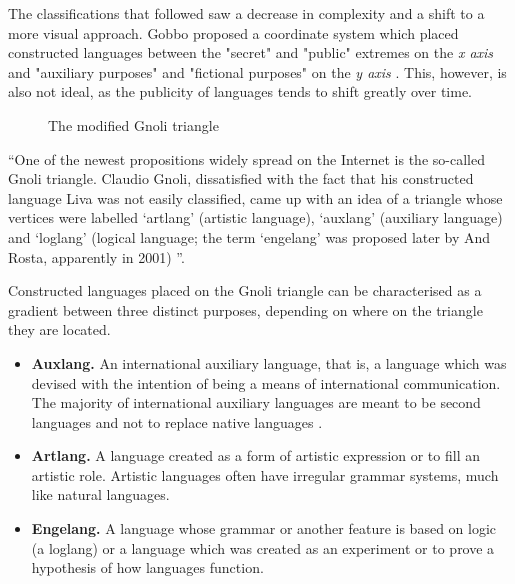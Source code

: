 \documentclass[14pt, a4paper]{extreport}
\begin{document}
The classifications that followed saw a decrease in complexity and a shift to a more visual approach. Gobbo proposed a coordinate system which placed constructed languages between the "secret" and "public" extremes on the \textit{x axis} and "auxiliary purposes" and "fictional purposes" on the \textit{y axis} \parencite{gobbo}. This, however, is also not ideal, as the publicity of languages tends to shift greatly over time.

\begin{figure}[ht]%
  \bigskip
  \centering
  \caption{The modified Gnoli triangle}
\end{figure}%

``One of the newest propositions widely spread on the Internet is the so-called Gnoli triangle. Claudio Gnoli, dissatisfied with the fact that his constructed language Liva was not easily classified, came up with an idea of a triangle whose vertices were labelled ‘artlang’ (artistic language), ‘auxlang’ (auxiliary language) and ‘loglang’ (logical language; the term ‘engelang’ was proposed later by And Rosta, apparently in 2001) \parencite[97]{stria}''.

Constructed languages placed on the Gnoli triangle can be characterised as a gradient between three distinct purposes, depending on where on the triangle they are located.

\begin{itemize}
  \item \textbf{Auxlang.} An international auxiliary language, that is, a language which was devised with the intention of being a means of international communication. The majority of international auxiliary languages are meant to be second languages and not to replace native languages \parencite{reed}.
  \item \textbf{Artlang.} A language created as a form of artistic expression or to fill an artistic role. Artistic languages often have irregular grammar systems, much like natural languages.
  \item \textbf{Engelang.} A language whose grammar or another feature is based on logic (a loglang) or a language which was created as an experiment or to prove a hypothesis of how languages function.
\end{itemize}
\end{document}
